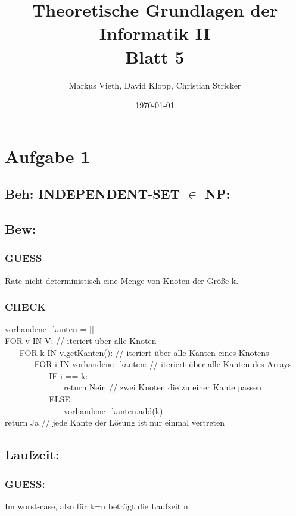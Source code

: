 \documentclass[a4paper,11pt,twoside]{article}
\title{Theoretische Grundlagen der Informatik II\\ Blatt 5}
\author{Markus Vieth, David Klopp, Christian Stricker}
\date{\today}
\newcommand{\green}[1]{\textcolor{comment_green}{#1}}
\begin{document}
\maketitle
\cleardoublepage
\pagestyle{myheadings}

\section*{Aufgabe 1}
\subsection*{Beh: INDEPENDENT-SET $\in$ NP:}
\subsection*{Bew:}
\subsubsection*{GUESS}
Rate nicht-deterministisch eine Menge von Knoten der Größe k.

\subsubsection*{CHECK}
vorhandene\_kanten = []\\
FOR v IN V: \green{// iteriert über alle Knoten} \\
$~~~~~~~~$FOR k IN v.getKanten(): \green{// iteriert über alle Kanten eines Knotens} \\
$~~~~~~~~~~~~~~~~$FOR i IN vorhandene\_kanten: \green{// iteriert über alle Kanten des Arrays}\\
$~~~~~~~~~~~~~~~~~~~~~~~~$IF i == k: \\
$~~~~~~~~~~~~~~~~~~~~~~~~~~~~~~~~$return Nein \green{// zwei Knoten die zu einer Kante passen} \\
$~~~~~~~~~~~~~~~~~~~~~~~~$ELSE:\\
$~~~~~~~~~~~~~~~~~~~~~~~~~~~~~~~~$vorhandene\_kanten.add(k) \\
return Ja \green{// jede Kante der Lösung ist nur einmal vertreten}


\subsection*{Laufzeit:}
\subsubsection*{GUESS:}
Im worst-case, also für k=n beträgt die Laufzeit n.
\end{document}
